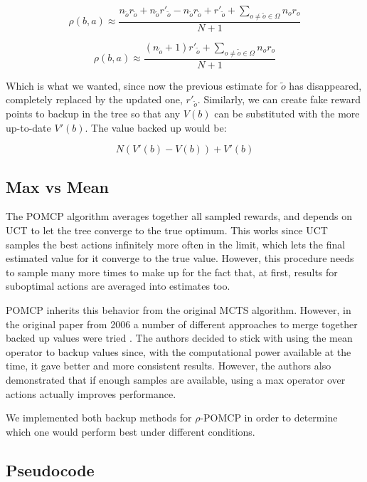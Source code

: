 \[ \rho(b,a) \approx \frac{ n_{\tilde{o}} r_{\tilde{o}} + n_{\tilde{o}}r'_{\tilde{o}} -
        n_{\tilde{o}} r_{\tilde{o}} + r'_{\tilde{o}} +
\sum_{o \neq \tilde{o} \in \Omega} n_o r_o}{N+1} \]

\[ \rho(b,a) \approx \frac{ ( n_{\tilde{o}}+1) r'_{\tilde{o}} +
\sum_{o \neq \tilde{o} \in \Omega} n_o r_o}{N+1} \]

Which is what we wanted, since now the previous estimate for $\tilde{o}$ has disappeared, completely
replaced by the updated one, $r'_{\tilde{o}}$. Similarly, we can create fake reward points to backup
in the tree so that any $V(b)$ can be substituted with the more up-to-date $V'(b)$. The value backed
up would be:

\[ N ( V'(b) - V(b) ) + V'(b) \]

%

\subsection{Max vs Mean}

The POMCP algorithm averages together all sampled rewards, and depends on UCT to let the tree
converge to the true optimum. This works since UCT samples the best actions infinitely more often in
the limit, which lets the final estimated value for it converge to the true value. However, this
procedure needs to sample many more times to make up for the fact that, at first, results for
suboptimal actions are averaged into estimates too.

POMCP inherits this behavior from the original MCTS algorithm. However, in the original paper from
2006 a number of different approaches to merge together backed up values were tried
\cite{cit:mcts}. The authors decided to stick with using the mean operator to backup values since,
with the computational power available at the time, it gave better and more consistent results.
However, the authors also demonstrated that if enough samples are available, using a max operator
over actions actually improves performance.

We implemented both backup methods for $\rho$-POMCP in order to determine which one would perform
best under different conditions.

\subsection{Pseudocode}

